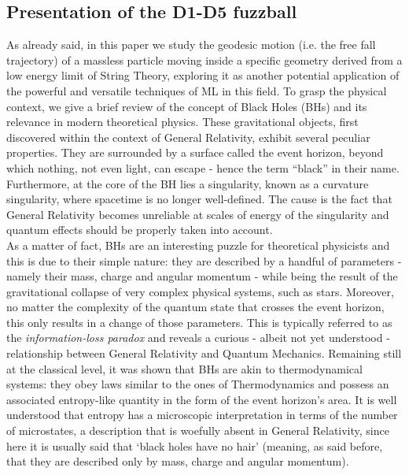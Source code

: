 \documentclass[prd,aps,a4paper,eqsecnum,nofootinbib,floatfix,twocolumn,superscriptaddress]{revtex4-2}
\renewcommand{\quote}[1]{``#1''}
\begin{document}
\subsection{Presentation of  the D1-D5 fuzzball}\label{sec:Presentation}
As already said, in this paper we study the geodesic motion (i.e. the free fall trajectory) of a massless particle moving inside a specific geometry derived from a low energy limit of String Theory, exploring it as another potential application of the powerful and versatile techniques of ML in this field. To grasp the physical context, we give a brief review of the concept of Black Holes (BHs) and its relevance in modern theoretical physics. These gravitational objects, first discovered within the context of General Relativity, exhibit several peculiar properties. They are surrounded by a surface called the event horizon, beyond which nothing, not even light, can escape - hence the term \quote{black} in their name. Furthermore, at the core of the BH lies a singularity, known as a curvature singularity, where spacetime is no longer well-defined. The cause is the fact that General Relativity becomes unreliable at scales of energy of the singularity and quantum effects should be properly taken into account.
\\

As a matter of fact, BHs are an interesting puzzle for theoretical physicists and this is due to their simple nature: they are described by a handful of parameters - namely their mass, charge and angular momentum - while being the result of the gravitational collapse of very complex physical systems, such as stars. Moreover, no matter the complexity of the quantum state that crosses the event horizon, this only results in a change of those parameters. This is typically referred to as the \textit{information-loss paradox} \cite{Mathur:2009hf} and reveals a curious - albeit not yet understood - relationship between General Relativity and Quantum Mechanics.
Remaining still at the classical level, it was shown that BHs are akin to thermodynamical systems: they obey laws similar to the ones of Thermodynamics \cite{PhysRevD.7.949} and possess an associated entropy-like quantity in the form of the event horizon’s area. 
It is well understood that entropy has a microscopic interpretation in terms of the number of microstates, a description that is woefully absent in General Relativity, since here it is usually said that `black holes have no hair' (meaning, as said before, that they are described only by mass, charge and angular momentum). 
\end{document}
